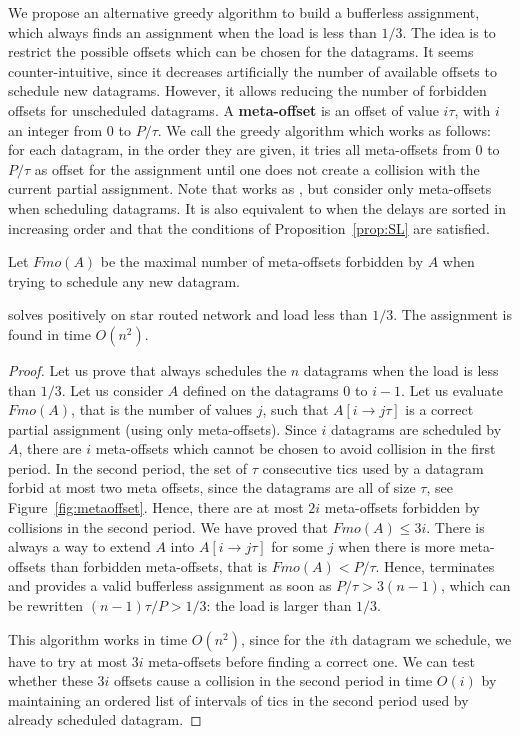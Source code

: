      We propose an alternative greedy algorithm to build a bufferless assignment, which always finds an assignment when the load is less than $1/3$.  
     The idea is to restrict the possible offsets which can be chosen for the datagrams. It seems counter-intuitive, since it decreases artificially the number of available offsets to schedule new datagrams. However, it allows reducing the number of forbidden offsets for unscheduled datagrams. A \textbf{meta-offset} is an offset of value $i\tau$, with $i$ an integer from $0$ to $P / \tau$. We call \metaoffset the greedy algorithm which works as follows: for each datagram, in the order they are given, it tries all meta-offsets from $0$ to $P/\tau$ as offset for the assignment until one does not create a collision with the current partial assignment. Note that \metaoffset works as \firstfit, but consider only meta-offsets when scheduling datagrams. It is also equivalent to \shortestlongest when the delays are sorted in increasing order and that the conditions of Proposition~\ref{prop:SL} are satisfied.

     Let $Fmo(A)$ be the maximal number of meta-offsets forbidden by $A$ when trying to schedule any new datagram. 



\begin{theorem}
\metaoffset solves \pazl positively on star routed network and load less than $1/3$. 
The assignment is found in time $O(n^2)$.
\end{theorem}
    \begin{proof}
    Let us prove that \metaoffset always schedules the $n$ datagrams when the load is less than $1/3$. Let us consider $A$ defined on the datagrams $0$ to $i-1$. Let us evaluate $Fmo(A)$, that is the number of values $j$, such that $A[i \rightarrow j\tau]$ is a correct partial assignment (using only meta-offsets).
    Since $i$ datagrams are scheduled by $A$, there are $i$ meta-offsets which cannot be chosen to avoid collision in the 
    first period. In the second period, the set of $\tau$ consecutive tics used by a datagram forbid at most two meta offsets, since the datagrams are all of size $\tau$, see Figure~\ref{fig:metaoffset}.  Hence, there are at most $2i$ meta-offsets forbidden by collisions in the second period. We have proved that $Fmo(A) \leq  3i$. There is always a way to extend $A$ into $A[i \rightarrow j\tau]$ for some $j$ when there is more meta-offsets than forbidden meta-offsets, that is $Fmo(A) < P/\tau$. Hence, \metaoffset terminates and provides a valid bufferless assignment as soon as $P/\tau > 3(n-1)$, which can be rewritten $(n-1)\tau /P > 1/3$: the load is larger than $1/3$.

     This algorithm works in time $O(n^2)$, since for the $i$th datagram we schedule, we have to try at most $3i$ meta-offsets before finding a correct one. We can test whether these $3i$ offsets cause a collision in the second period in time $O(i)$ by maintaining an ordered list of intervals of tics in the second period used by already scheduled datagram.
     \end{proof}
         
